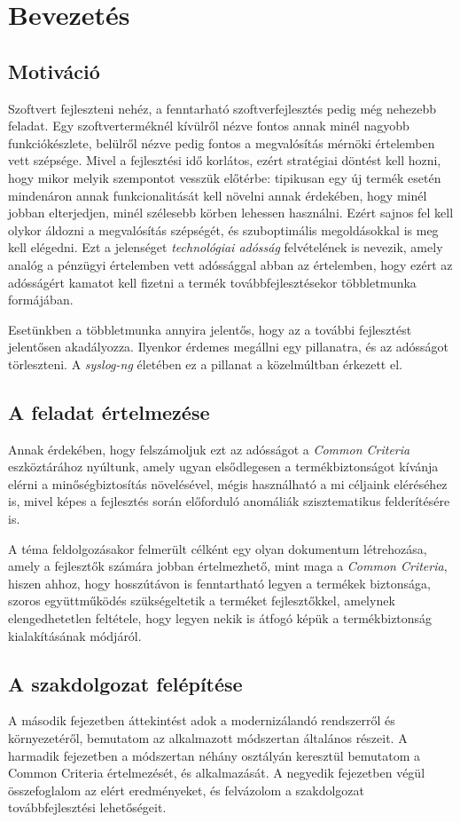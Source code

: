 \chapter{Bevezetés}

\section{Motiváció}

Szoftvert fejleszteni nehéz, a fenntarható szoftverfejlesztés pedig még nehezebb feladat.
Egy szoftverterméknél kívülről nézve fontos annak minél nagyobb funkciókészlete, belülről nézve
pedig fontos a megvalósítás mérnöki értelemben vett szépsége.
Mivel a fejlesztési idő korlátos, ezért stratégiai döntést kell hozni, hogy mikor melyik szempontot
vesszük előtérbe: tipikusan egy új termék esetén mindenáron annak funkcionalitását kell növelni
annak érdekében, hogy minél jobban elterjedjen, minél szélesebb körben lehessen használni.  Ezért
sajnos fel kell olykor áldozni a megvalósítás szépségét, és szuboptimális megoldásokkal is meg kell
elégedni. Ezt a jelenséget \emph{technológiai adósság}\cite{magnusson2014technology} felvételének is
nevezik, amely analóg a pénzügyi értelemben vett adóssággal abban az értelemben, hogy ezért az
adósságért kamatot kell fizetni a termék továbbfejlesztésekor többletmunka formájában.

Esetünkben a többletmunka annyira jelentős, hogy az a további fejlesztést jelentősen akadályozza.
Ilyenkor érdemes megállni egy pillanatra, és az adósságot törleszteni. A \emph{syslog-ng} életében
ez a pillanat a közelmúltban érkezett el.

\section{A feladat értelmezése}
Annak érdekében, hogy felszámoljuk ezt az adósságot a \emph{Common Criteria} eszköztárához nyúltunk,
amely ugyan elsődlegesen a termékbiztonságot kívánja elérni a minőségbiztosítás növelésével,
mégis használható a mi céljaink eléréséhez is, mivel képes a fejlesztés során előforduló anomáliák
szisztematikus felderítésére is.

A téma feldolgozásakor felmerült célként egy olyan dokumentum létrehozása, amely a fejlesztők
számára jobban értelmezhető, mint maga a \emph{Common Criteria}, hiszen ahhoz, hogy hosszútávon is
fenntartható legyen a termékek biztonsága, szoros együttműködés szükségeltetik a terméket
fejlesztőkkel, amelynek elengedhetetlen feltétele, hogy legyen nekik is átfogó képük
a termékbiztonság kialakításának módjáról.

\section{A szakdolgozat felépítése}
A második fejezetben áttekintést adok a modernizálandó rendszerről és környezetéről, bemutatom az
alkalmazott módszertan általános részeit. A harmadik fejezetben a módszertan néhány osztályán
keresztül bemutatom a Common Criteria értelmezését, és alkalmazását. A negyedik fejezetben végül
összefoglalom az elért eredményeket, és felvázolom a szakdolgozat továbbfejlesztési lehetőségeit.

